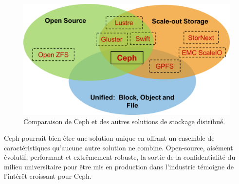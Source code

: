 \begin{figure}
	\centering
    \includegraphics[scale=.5]{images/ceph_diagram.png}
    \caption{\label{chap1:sec3:ceph_compare}Comparaison de Ceph et des autres solutions de stockage distribué.}
\end{figure}

\begin{PimpedBox}
Ceph pourrait bien être une solution unique en offrant un ensemble de caractéristiques qu'aucune autre solution ne combine. Open-source, aisément évolutif, performant et extrêmement robuste, la sortie de la confidentialité du milieu universitaire pour être mis en production dans l'industrie témoigne de l'intérêt croissant pour Ceph.
\end{PimpedBox}